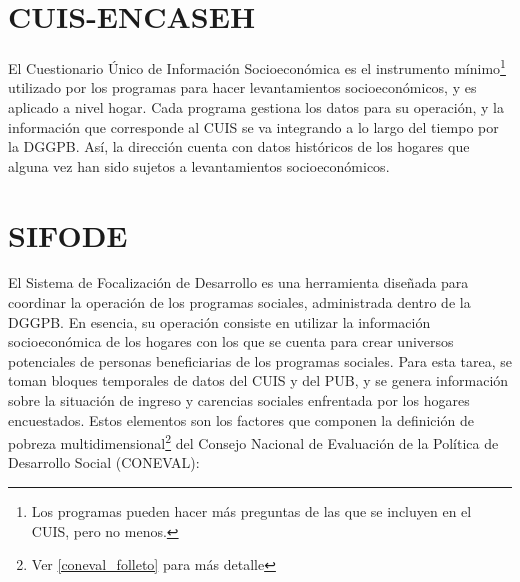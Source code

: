 \section{CUIS-ENCASEH}
El Cuestionario Único de Información Socioeconómica es el instrumento mínimo\footnote{Los programas pueden hacer más preguntas de las que se incluyen en el CUIS, pero no menos.} utilizado por los programas para hacer levantamientos socioeconómicos, y es aplicado a nivel hogar. Cada programa gestiona los datos para su operación, y la información que corresponde al CUIS se va integrando a lo largo del tiempo por la DGGPB. Así, la dirección cuenta con datos históricos de los hogares que alguna vez han sido sujetos a levantamientos socioeconómicos.
\section{SIFODE}
El Sistema de Focalización de Desarrollo es una herramienta diseñada para coordinar la operación de los programas sociales, administrada dentro de la DGGPB. En esencia, su operación consiste en utilizar la información socioeconómica de los hogares con los que se cuenta para crear universos potenciales de personas beneficiarias de los programas sociales. Para esta tarea, se toman bloques temporales de datos del CUIS y del PUB, y se genera información sobre la situación de ingreso y carencias sociales enfrentada por los hogares encuestados. Estos elementos son los factores que componen la definición de pobreza multidimensional\footnote{Ver \ref{coneval_folleto} para más detalle} del Consejo Nacional de Evaluación de la Política de Desarrollo Social (CONEVAL):
